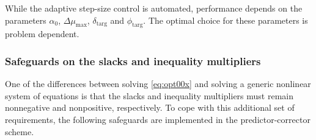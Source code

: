\begin{remark}
  While the adaptive step-size control is automated, performance depends on the
  parameters $\alpha_0$, $\Delta \mu_{\max}$, $\delta_{\text{targ}}$ and
  $\phi_{\text{targ}}$.  The optimal choice for these parameters is problem
  dependent.
\end{remark}

\subsubsection{Safeguards on the slacks and inequality multipliers}\label{sec:fraction}
One of the differences between solving \eqref{eq:opt00x} and solving a generic
nonlinear system of equations is that the slacks and inequality multipliers must
remain nonnegative and nonpositive, respectively.  To cope with this additional
set of requirements, the following safeguards are implemented in the
predictor-corrector scheme.
